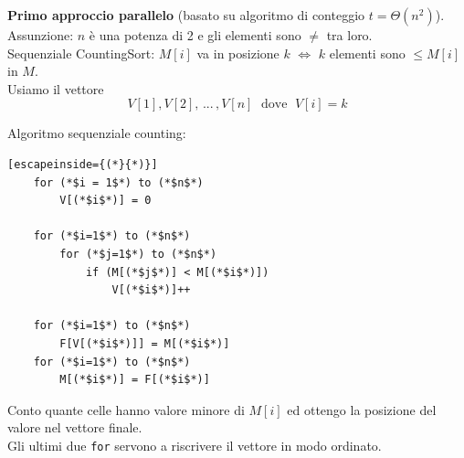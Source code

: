 \documentclass[11pt]{article}
\begin{document}
	\newpage
	
	\textbf{Primo approccio parallelo } (basato su algoritmo di conteggio $t = \Theta (n^2)$).\\
	
	Assunzione: $n$ è una potenza di 2 e gli elementi sono $\neq$ tra loro.\\
	
	Sequenziale CountingSort: $M[i]$ va in posizione $k$ $\Leftrightarrow$ $k$ elementi sono $\leq M[i]$ in $M$.\\
	
	Usiamo il vettore 
	$$ V[1], V[2], \, ... \, , V[n] \; \text{ dove }\; V[i] = k $$
	
	Algoritmo sequenziale counting:
	\begin{lstlisting}[escapeinside={(*}{*)}]
	for (*$i = 1$*) to (*$n$*)
		V[(*$i$*)] = 0
		
	for (*$i=1$*) to (*$n$*)
		for (*$j=1$*) to (*$n$*)
			if (M[(*$j$*)] < M[(*$i$*)])
				V[(*$i$*)]++
		
	for (*$i=1$*) to (*$n$*)
		F[V[(*$i$*)]] = M[(*$i$*)]
	for (*$i=1$*) to (*$n$*)
		M[(*$i$*)] = F[(*$i$*)]
	\end{lstlisting}
	
	Conto quante celle hanno valore minore di $M[i]$ ed ottengo la posizione del valore nel vettore finale.\\
	Gli ultimi due \texttt{for} servono a riscrivere il vettore in modo ordinato.\\
	
	
	
\end{document}
